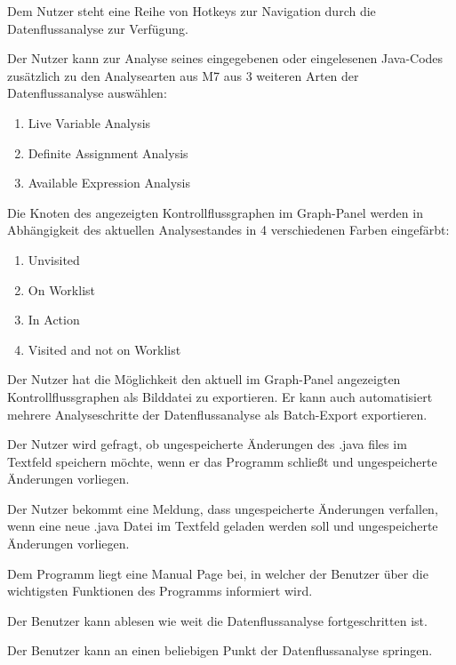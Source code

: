Dem Nutzer steht eine Reihe von Hotkeys zur Navigation durch die
Datenflussanalyse zur Verfügung.

Der Nutzer kann zur Analyse seines eingegebenen oder eingelesenen Java-Codes
zusätzlich zu den Analysearten aus M7 aus 3 weiteren Arten der Datenflussanalyse
auswählen:
\begin{enumerate}[label=(\alph*)]
\item  Live Variable Analysis
\item Definite Assignment Analysis
\item Available Expression Analysis
\end{enumerate}

Die Knoten des angezeigten Kontrollflussgraphen im Graph-Panel werden in
Abhängigkeit des aktuellen Analysestandes in 4 verschiedenen Farben eingefärbt:
\begin{enumerate}[label=(\alph*)]
\item Unvisited
\item On Worklist
\item In Action
\item Visited and not on Worklist
\end{enumerate}

Der Nutzer hat die Möglichkeit den aktuell im Graph-Panel angezeigten Kontrollflussgraphen als Bilddatei zu exportieren. Er kann auch automatisiert mehrere Analyseschritte der Datenflussanalyse als Batch-Export exportieren.

Der Nutzer wird gefragt, ob ungespeicherte Änderungen des .java files im Textfeld
speichern möchte, wenn er das Programm schließt und ungespeicherte Änderungen vorliegen.

Der Nutzer bekommt eine Meldung, dass ungespeicherte Änderungen verfallen,
wenn eine neue .java Datei im Textfeld geladen werden soll und ungespeicherte
Änderungen vorliegen.

Dem Programm liegt eine Manual Page bei, in welcher der Benutzer über die wichtigsten Funktionen des Programms informiert wird.

Der Benutzer kann ablesen wie weit die Datenflussanalyse fortgeschritten ist.

Der Benutzer kann an einen beliebigen Punkt der Datenflussanalyse springen.